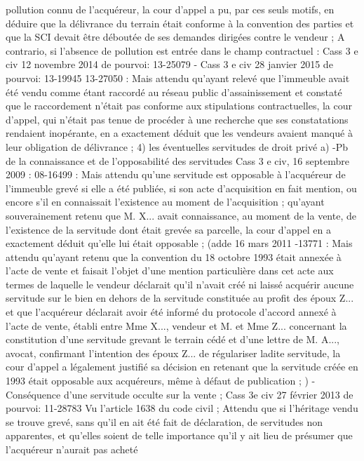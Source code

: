 \documentclass[11pt,a4paper]{report}
\begin{document}
	pollution connu de l'acquéreur, la cour d'appel a pu, par ces seuls motifs, en déduire que la délivrance du
	terrain était conforme à la convention des parties et que la SCI devait être déboutée de ses demandes dirigées
	contre le vendeur ; A contrario, si l’absence de pollution est entrée dans le champ contractuel : Cass 3 e civ 12
	novembre 2014 \No  de pourvoi: 13-25079
	- Cass 3 e civ 28 janvier 2015 \No  de pourvoi: 13-19945 13-27050 : Mais attendu qu'ayant relevé que
	l'immeuble avait été vendu comme étant raccordé au réseau public d'assainissement et constaté que le
	raccordement n'était pas conforme aux stipulations contractuelles, la cour d'appel, qui n'était pas tenue de
	procéder à une recherche que ses constatations rendaient inopérante, en a exactement déduit que les vendeurs
	avaient manqué à leur obligation de délivrance ;
	4) les éventuelles servitudes de droit privé
	a) -Pb de la connaissance et de l’opposabilité des servitudes
	Cass 3 e civ, 16 septembre 2009 \No : 08-16499 : Mais attendu qu'une servitude est opposable à l'acquéreur de
	l'immeuble grevé si elle a été publiée, si son acte d'acquisition en fait mention, ou encore s'il en connaissait
	l'existence au moment de l'acquisition ; qu'ayant souverainement retenu que M. X... avait connaissance, au
	moment de la vente, de l'existence de la servitude dont était grevée sa parcelle, la cour d'appel en a exactement
	déduit qu'elle lui était opposable ; (adde 16 mars 2011 -13771 : Mais attendu qu'ayant retenu que la
	convention du 18 octobre 1993 était annexée à l'acte de vente et faisait l'objet d'une mention particulière dans
	cet acte aux termes de laquelle le vendeur déclarait qu'il n'avait créé ni laissé acquérir aucune servitude sur le
	bien en dehors de la servitude constituée au profit des époux Z... et que l'acquéreur déclarait avoir été informé
	du protocole d'accord annexé à l'acte de vente, établi entre Mme X..., vendeur et M. et Mme Z... concernant la
	constitution d'une servitude grevant le terrain cédé et d'une lettre de M. A..., avocat, confirmant l'intention des
	époux Z... de régulariser ladite servitude, la cour d'appel a légalement justifié sa décision en retenant que la
	servitude créée en 1993 était opposable aux acquéreurs, même à défaut de publication ; )
	- Conséquence d’une servitude occulte sur la vente ; Cass 3e civ 27 février 2013 \No  de pourvoi: 11-28783
	Vu l'article 1638 du code civil ;
	Attendu que si l'héritage vendu se trouve grevé, sans qu'il en ait été fait de déclaration, de servitudes non
	apparentes, et qu'elles soient de telle importance qu'il y ait lieu de présumer que l'acquéreur n'aurait pas acheté
\end{document}
